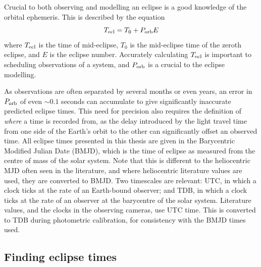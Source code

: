 Crucial to both observing and modelling an eclipse is a good knowledge of the orbital ephemeris. This is described by the equation
\begin{equation}
    \label{eqn:modelling:general ephemeris equation}
    T_{\rm ecl} = T_0 + P_{\rm orb} E
\end{equation}
where $T_{\rm ecl}$ is the time of mid-eclipse, $T_0$ is the mid-eclipse time of the zeroth eclipse, and $E$ is the eclipse number. Accurately calculating $T_{\rm ecl}$ is important to scheduling observations of a system, and $P_{\rm orb}$ is a crucial to the eclipse modelling.

As observations are often separated by several months or even years, an error in $P_{\rm orb}$ of even $\sim 0.1$ seconds can accumulate to give significantly inaccurate predicted eclipse times. This need for precision also requires the definition of {\it where} a time is recorded from, as the delay introduced by the light travel time from one side of the Earth's orbit to the other can significantly offset an observed time. All eclipse times presented in this thesis are given in the Barycentric Modified Julian Date (BMJD), which is the time of eclipse as measured from the centre of mass of the solar system. Note that this is different to the heliocentric MJD often seen in the literature, and where heliocentric literature values are used, they are converted to BMJD.
Two timescales are relevant: UTC, in which a clock ticks at the rate of an Earth-bound observer; and TDB, in which a clock ticks at the rate of an observer at the barycentre of the solar system. Literature values, and the clocks in the observing cameras, use UTC time. This is converted to TDB during photometric calibration, for consistency with the BMJD times used.

\subsection{Finding eclipse times}
\label{sect:modelling:finding eclipse times}

